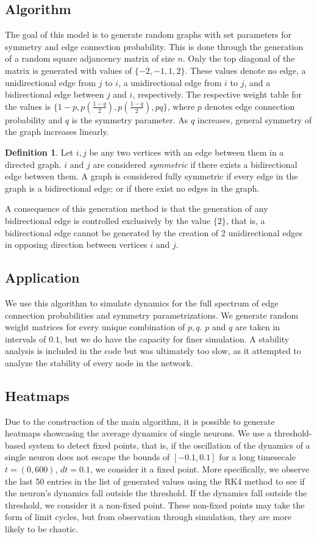 \documentclass{article}
\theoremstyle{definition}
\newtheorem{defn}[thm]{Definition}
\theoremstyle{remark}
\begin{document}
\subsection{Algorithm}
The goal of this model is to generate random graphs with set parameters for symmetry and edge connection probability. This is done through the generation of a random square adjancency matrix of size $n$. Only the top diagonal of the matrix is generated with values of $\{-2,-1,1,2\}$. These values denote no edge, a unidirectional edge from $j$ to $i$, a unidirectional edge from $i$ to $j$, and a bidirectional edge between $j$ and $i$, respectively. The respective weight table for the values is $\{1-p, p(\frac{1-q}{2} ), p(\frac{1-q}{2} ), pq\}$, where $p$ denotes edge connection probability and $q$ is the symmetry parameter. As $q$ increases, general symmetry of the graph increases linearly.
\begin{defn}
Let $i,j$ be any two vertices with an edge between them in a directed graph. $i$ and $j$ are considered \textit{symmetric} if there exists a bidirectional edge between them. A graph is considered fully symmetric if every edge in the graph is a bidirectional edge; or if there exist no edges in the graph.
\end{defn}
A consequence of this generation method is that the generation of any bidirectional edge is controlled exclusively by the value $\{2\}$, that is, a bidirectional edge cannot be generated by the creation of 2 unidirectional edges in opposing direction between vertices $i$ and $j$.

\subsection{Application}
We use this algorithm to simulate dynamics for the full spectrum of edge connection probabilities and symmetry parametrizations. We generate random weight matrices for every unique combination of $p,q$. $p$ and $q$ are taken in intervals of $0.1$, but we do have the capacity for finer simulation. A stability analysis is included in the code but was ultimately too slow, as it attempted to analyze the stability of every node in the network.

\subsection{Heatmaps}
Due to the construction of the main algorithm, it is possible to generate heatmaps showcasing the average dynamics of single neurons. We use a threshold-based system to detect fixed points, that is, if the oscillation of the dynamics of a single neuron does not escape the bounds of $[-0.1,0.1]$ for a long timesecale $t=(0,600)$, $dt = 0.1$, we consider it a fixed point. More specifically, we observe the last 50 entries in the list of generated values using the RK4 method to see if the neuron's dynamics fall outside the threshold. If the dynamics fall outside the threshold, we consider it a non-fixed point. These non-fixed points may take the form of limit cycles, but from observation through simulation, they are more likely to be chaotic.
\end{document}
